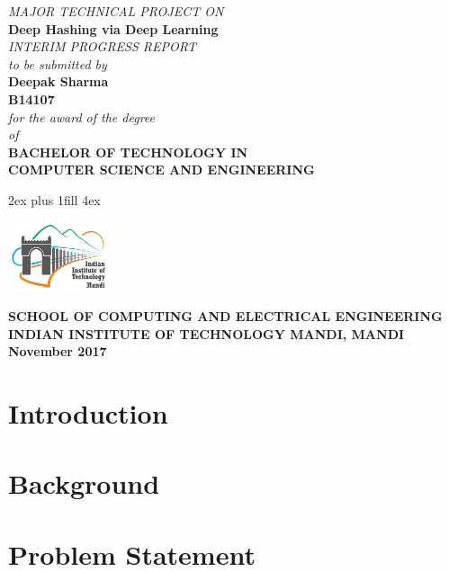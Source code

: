\documentclass[12pt, a4paper,twoside]{article}
\renewcommand{\baselinestretch}{1.20}
\begin{document}
\thispagestyle{empty}
\begin{center}
	{\large {\em MAJOR TECHNICAL PROJECT ON} }\\[5ex]

	{\Large{\bf Deep Hashing via Deep Learning  }}\\[15ex]
	{\large {\em INTERIM PROGRESS REPORT}}\\[2ex]
	{\em to be submitted by}\\[5ex]
	{\large{\bf Deepak Sharma}}\\
	{\large{\bf B14107}}\\[3ex]
	{\em for the award of the degree}\\
	{\em of}\\[3ex]
	{\bf  BACHELOR OF TECHNOLOGY IN }\\
	{\large \bf  COMPUTER SCIENCE AND ENGINEERING }
\end{center}

\vglue 2ex plus 1fill  %
\vglue 4ex
\centerline{\includegraphics[width=3cm]{images/logo}}

\begin{center}
	{\normalsize \bf SCHOOL OF COMPUTING AND ELECTRICAL ENGINEERING}\\[1ex]
	{\large \bf INDIAN INSTITUTE OF TECHNOLOGY MANDI, MANDI}\\[2ex]
	{\bf November 2017} 
\end{center}
\clearpage
\thispagestyle{empty}

\setcounter{page}{1}

\section{Introduction}

\clearpage


\section{Background}

\clearpage

\section{Problem Statement}

 \clearpage
\end{document}
